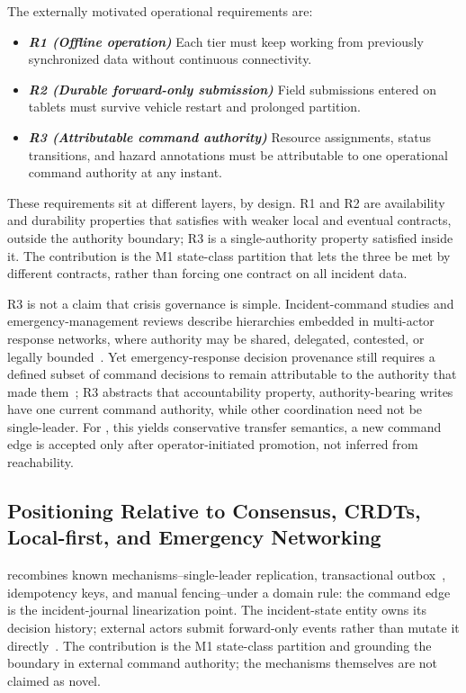 The externally motivated operational requirements are:
\begin{itemize}
  \item \textbf{\textit{R1 (Offline operation)}} Each tier must keep working from
  previously synchronized data without continuous connectivity.
  \item \textbf{\textit{R2 (Durable forward-only submission)}} Field submissions entered
  on tablets must survive vehicle restart and prolonged partition.
  \item \textbf{\textit{R3 (Attributable command authority)}} Resource assignments,
  status transitions, and hazard annotations must be attributable to one
  operational command authority at any instant.
\end{itemize}

These requirements sit at different layers, by design. R1 and R2 are
availability and durability properties that \systemname{} satisfies with weaker
local and eventual contracts, outside the authority boundary; R3 is a
single-authority property satisfied inside it. The contribution is the M1
state-class partition that lets the three be met by different contracts, rather
than forcing one contract on all incident data.

R3 is not a claim that crisis governance is simple. Incident-command studies and
emergency-management reviews describe hierarchies embedded in multi-actor
response networks, where authority may be shared, delegated, contested, or
legally bounded~\cite{moynihan2008combining,wennman2022organizational,dalessio2024leading}.
Yet emergency-response decision provenance still requires a defined subset of
command decisions to remain attributable to the authority that made
them~\cite{naja2010provenance}; R3 abstracts that accountability property,
authority-bearing writes have one current command authority, while other
coordination need not be single-leader. For \systemname{}, this yields conservative
transfer semantics, a new command edge is accepted only after
operator-initiated promotion, not inferred from reachability.

\subsection{Positioning Relative to Consensus, CRDTs, Local-first, and Emergency Networking}
\label{sec:positioning}

\systemname{} recombines known mechanisms--single-leader replication,
transactional outbox~\cite{richardson2018microservices}, idempotency keys, and
manual fencing--under a domain rule: the command edge is the incident-journal
linearization point. The incident-state entity owns its decision history;
external actors submit forward-only events rather than mutate it
directly~\cite{helland2017life}. The contribution is the M1 state-class
partition and grounding the boundary in external command authority; the
mechanisms themselves are not claimed as novel.

